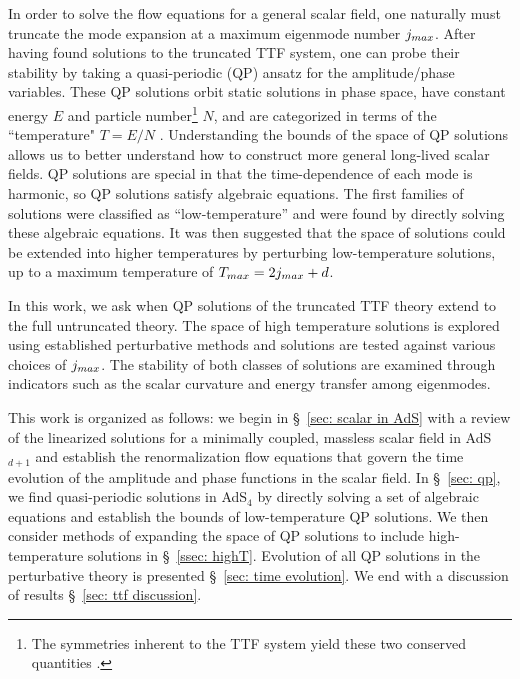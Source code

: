 \documentclass[../PhD.tex]{subfiles}
\begin{document}
In order to solve the flow equations for a general scalar field, one naturally must truncate the mode expansion at a maximum eigenmode number $j_{max}$. After having found solutions to the truncated TTF system, one can probe their stability by taking a quasi-periodic (QP) ansatz for the amplitude/phase variables. These QP solutions orbit static solutions in phase space, have constant energy $E$ and particle number\footnote{The symmetries inherent to the TTF system yield these two conserved quantities \cite{1412.4761}.} $N$, and are categorized in terms of the ``temperature" $T= E/N$ \cite{1403.6471,1507.08261}. Understanding the bounds of the space of QP solutions allows us to better understand how to construct more general long-lived scalar fields. QP solutions are special in that the time-dependence of each mode is harmonic, so QP solutions satisfy algebraic equations. The first families of solutions were classified as ``low-temperature'' and were found by directly solving these algebraic equations\cite{1507.08261}. It was then suggested that the space of solutions could be extended into higher temperatures by perturbing low-temperature solutions, up to a maximum temperature of $T_{max} = 2j_{max} + d$. 

In this work, we ask when QP solutions of the truncated TTF theory extend to the full untruncated theory. The space of high temperature solutions is explored using established perturbative methods and solutions are tested against various choices of $j_{max}$. The stability of both classes of solutions are examined through indicators such as the scalar curvature and energy transfer among eigenmodes. 

This work is organized as follows: we begin in \S~\!\ref{sec: scalar in AdS} with a review of the linearized solutions for a minimally coupled, massless scalar field in AdS$_{d+1}$ and establish the renormalization flow equations that govern the time evolution of the amplitude and phase functions in the scalar field. In \S~\!\ref{sec: qp}, we find quasi-periodic solutions in AdS$_4$ by directly solving a set of algebraic equations and establish the bounds of low-temperature QP solutions. We then consider methods of expanding the space of QP solutions to include high-temperature solutions in \S\!~\ref{ssec: highT}. Evolution of all QP solutions in the perturbative theory is presented \S\!~\ref{sec: time evolution}. We end with a discussion of results \S~\!\ref{sec: ttf discussion}. 

\end{document}

